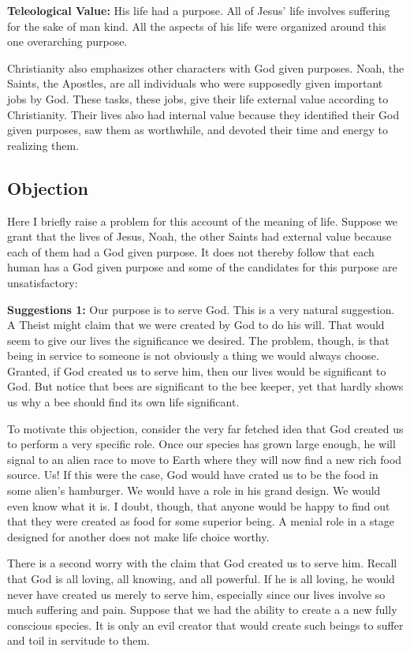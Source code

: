 \documentclass[]{article}
\begin{document}
\textbf{Teleological Value:} His life had a purpose. All of Jesus' life
involves suffering for the sake of man kind. All the aspects of his life
were organized around this one overarching purpose.

Christianity also emphasizes other characters with God given purposes.
Noah, the Saints, the Apostles, are all individuals who were supposedly
given important jobs by God. These tasks, these jobs, give their life
external value according to Christianity. Their lives also had internal
value because they identified their God given purposes, saw them as
worthwhile, and devoted their time and energy to realizing them.

\subsection{Objection}\label{objection}

Here I briefly raise a problem for this account of the meaning of life.
Suppose we grant that the lives of Jesus, Noah, the other Saints had
external value because each of them had a God given purpose. It does not
thereby follow that each human has a God given purpose and some of the
candidates for this purpose are unsatisfactory:

\textbf{Suggestions 1:} Our purpose is to serve God. This is a very
natural suggestion. A Theist might claim that we were created by God to
do his will. That would seem to give our lives the significance we
desired. The problem, though, is that being in service to someone is not
obviously a thing we would always choose. Granted, if God created us to
serve him, then our lives would be significant to God. But notice that
bees are significant to the bee keeper, yet that hardly shows us why a
bee should find its own life significant.

To motivate this objection, consider the very far fetched idea that God
created us to perform a very specific role. Once our species has grown
large enough, he will signal to an alien race to move to Earth where
they will now find a new rich food source. Us! If this were the case,
God would have crated us to be the food in some alien's hamburger. We
would have a role in his grand design. We would even know what it is. I
doubt, though, that anyone would be happy to find out that they were
created as food for some superior being. A menial role in a stage
designed for another does not make life choice worthy.

There is a second worry with the claim that God created us to serve him.
Recall that God is all loving, all knowing, and all powerful. If he is
all loving, he would never have created us merely to serve him,
especially since our lives involve so much suffering and pain. Suppose
that we had the ability to create a a new fully conscious species. It is
only an evil creator that would create such beings to suffer and toil in
servitude to them.
\end{document}
